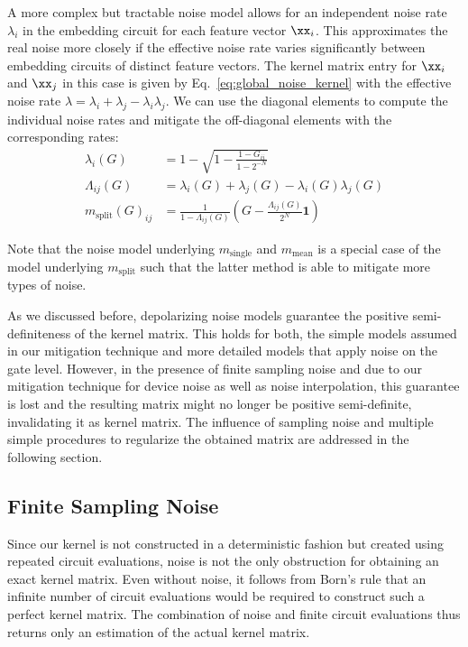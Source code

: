 \documentclass[twocolumn,superscriptaddress,nofootinbib]{revtex4-2}
\begin{document}
A more complex but tractable noise model allows for an independent noise rate $\lambda_i$ in the embedding circuit for each feature vector $\xx_i$.
This approximates the real noise more closely if the effective noise rate varies significantly between embedding circuits of distinct feature vectors. 
The kernel matrix entry for $\xx_i$ and $\xx_j$ in this case is given by Eq.~\eqref{eq:global_noise_kernel} with the effective noise rate $\lambda=\lambda_i+\lambda_j-\lambda_i\lambda_j$.
We can use the diagonal elements to compute the individual noise rates and mitigate the off-diagonal elements with the corresponding rates:
\begin{align}
    \lambda_i(G) &= 1-\sqrt{1-\frac{1-G_{ii}}{1-2^{-N}}}\label{eq:m_split_0}\\
    \Lambda_{ij}(G) &= \lambda_i(G)+\lambda_j(G)-\lambda_i(G)\lambda_j(G)\label{eq:m_split_1}\\
    m_\mathrm{split}(G)_{ij} &=  \frac{1}{1-\Lambda_{ij}(G)}\left(G-\frac{\Lambda_{ij}(G)}{2^N}\mathbf{1}\right)\label{eq:m_split_2}
\end{align}

Note that the noise model underlying $m_\mathrm{single}$ and $m_\mathrm{mean}$ is a special case of the model underlying $m_\mathrm{split}$ such that the latter method is able to mitigate more types of noise.

As we discussed before, depolarizing noise models guarantee the positive semi-definiteness of the kernel matrix.
This holds for both, the simple models assumed in our mitigation technique and more detailed models that apply noise on the gate level.
However, in the presence of finite sampling noise and due to our mitigation technique for device noise as well as noise interpolation, this guarantee is lost and the resulting matrix might no longer be positive semi-definite, invalidating it as kernel matrix.
The influence of sampling noise and multiple simple procedures to regularize the obtained matrix are addressed in the following section.

\subsection{Finite Sampling Noise}
    Since our kernel is not constructed in a deterministic fashion but created using repeated circuit evaluations, noise is not the only obstruction for obtaining an exact kernel matrix. Even without noise, it follows from Born's rule that an infinite number of circuit evaluations would be required to construct such a perfect kernel matrix. The combination of noise and finite circuit evaluations thus returns only an estimation of the actual kernel matrix.
    
\end{document}
